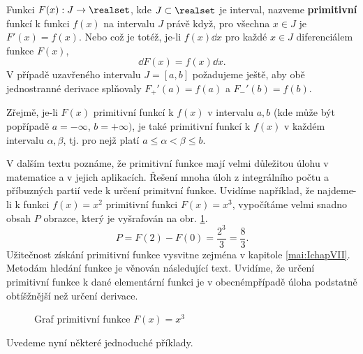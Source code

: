     \begin{mdframed}[style=mdmathdef] 
      \begin{definition}\label{mai:def002}
        Funkci \(F(x): J\rightarrow \realset\), kde \(J\subset \realset\) je interval, nazveme
        \textbf{primitivní} funkcí k funkci \(f(x)\) na intervalu \(J\) právě když, pro všechna
        \(x\in J\) je \(F'(x) = f(x)\). Nebo což je totéž, je-li \(f(x)\dd{x}\) pro každé \(x\in J\)
        diferenciálem funkce \(F(x)\),
        \begin{equation*}
          \dd{F}(x) = f(x)\dd{x}.
        \end{equation*}        
        V případě uzavřeného intervalu \(J=[a,b]\) požadujeme ještě, aby obě jednostranné derivace
        splňovaly \(F_+'(a)=f(a)\) a \(F_-'(b)=f(b)\). 
      \end{definition}
    \end{mdframed}

    Zřejmě, je-li \(F(x)\) primitivní funkcí k \(f(x)\) v intervalu \(a,b\) (kde může být popřípadě
    \(a=-\infty\), \(b=+\infty)\), je také primitivní funkcí k \(f(x)\) v každém intervalu \(\alpha,
    \beta\), tj. pro nejž platí \(a\leq\alpha<\beta\leq b\). 

    V dalším textu poznáme, že primitivní funkce mají velmi důležitou úlohu v matematice a v jejich
    aplikacích. Řešení mnoha úloh z integrálního počtu a příbuzných partií vede k určení primitvní
    funkce. Uvidíme například, že najdeme-li k funkci \(f(x)= x^2\) primitivní funkci \(F(x) =
    x^3\), vypočítáme velmi snadno obsah \(P\) obrazce, který je vyšrafován na obr.
    \ref{mai:fig099}.
    \begin{equation*}
      P = F(2) - F(0) = \frac{2^3}{3} = \frac{8}{3}.
    \end{equation*}
    Užitečnost získání primitivní funkce vysvitne zejména v kapitole \ref{mai:IchapVII}. Metodám
    hledání funkce je věnován následující text. Uvidíme, že určení primitivní funkce k dané
    elementární funkci je v obecnémpřípadě úloha podstatně obtíšžnější než určení derivace.  
    
    \begin{figure}[ht!]
      \centering
      \caption{Graf primitivní funkce \(F(x) = x^3\)}
      \label{mai:fig099}
    \end{figure}

    Uvedeme nyní některé jednoduché příklady.
    

